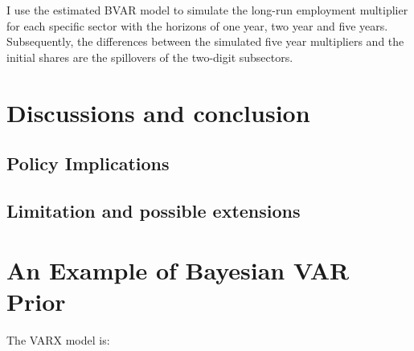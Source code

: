 \documentclass{monashthesis}
\begin{document}
I use the estimated BVAR model to simulate the long-run employment multiplier for each specific sector with the horizons of one year, two year and five years. Subsequently, the differences between the simulated five year multipliers and the initial shares are the spillovers of the two-digit subsectors.

\hypertarget{discussions-and-conclusion}{%
\chapter{Discussions and conclusion}\label{discussions-and-conclusion}}

\hypertarget{policy-implications}{%
\section{Policy Implications}\label{policy-implications}}

\hypertarget{limitation-and-possible-extensions}{%
\section{Limitation and possible extensions}\label{limitation-and-possible-extensions}}

\appendix

\hypertarget{an-example-of-bayesian-var-prior}{%
\chapter{An Example of Bayesian VAR Prior}\label{an-example-of-bayesian-var-prior}}

The VARX model is:
\end{document}
